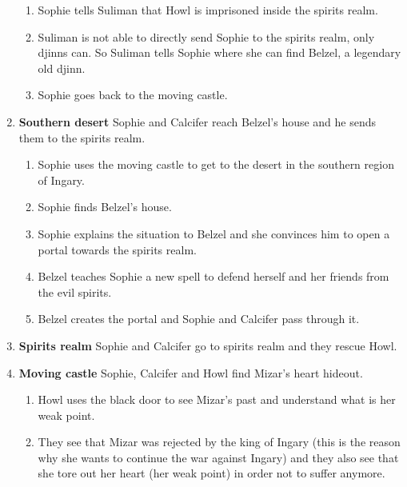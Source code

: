 \begin{enumerate}
\begin{enumerate}
    \item Sophie tells Suliman that Howl is imprisoned inside the spirits realm.
    
    \item Suliman is not able to directly send Sophie to the spirits realm, only djinns can. So Suliman tells Sophie where she can find Belzel, a legendary old djinn.
    
    \item Sophie goes back to the moving castle.
  \end{enumerate}

\item \textbf{Southern desert} Sophie and Calcifer reach Belzel’s house and he sends them to the spirits realm.

  \begin{enumerate}
  \item Sophie uses the moving castle to get to the desert in the southern region of Ingary.
    
  \item Sophie finds Belzel’s house.
    
  \item Sophie explains the situation to Belzel and she convinces him to open a portal towards the spirits realm.
    
  \item Belzel teaches Sophie a new spell to defend herself and her friends from the evil spirits.
    
  \item Belzel creates the portal and Sophie and Calcifer pass through it.
  \end{enumerate}

\item \textbf{Spirits realm} Sophie and Calcifer go to spirits realm and they rescue Howl.

\item \textbf{Moving castle} Sophie, Calcifer and Howl find Mizar’s heart hideout.

  \begin{enumerate}
  \item Howl uses the black door to see Mizar’s past and understand what is her weak point.
    
  \item They see that Mizar was rejected by the king of Ingary (this is the reason why she wants to continue the war against Ingary) and they also see that she tore out her heart (her weak point) in order not to suffer anymore.
    

\end{enumerate}
\end{enumerate}
